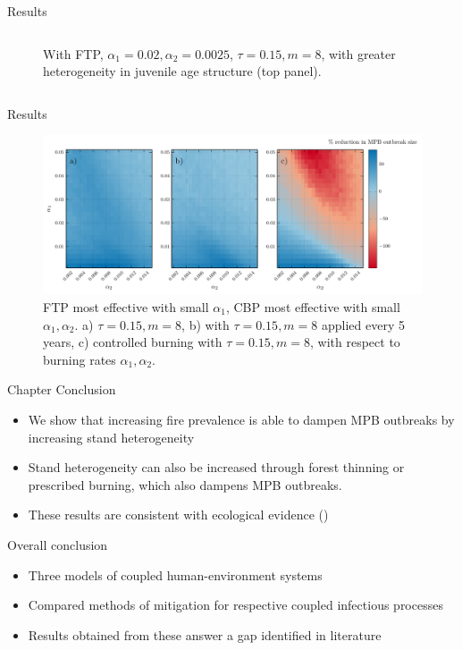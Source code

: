 \documentclass{beamer}
\begin{document}
\begin{frame}{Results}
\begin{columns}
\begin{column}[]{0.5\textwidth}
\begin{figure}
                \caption{\small With FTP, $\alpha_1 = 0.02, \alpha_2 = 0.0025$, $\tau = 0.15, m = 8$, with greater heterogeneity in juvenile age structure (top panel).}
            \end{figure}
        \end{column}
    \end{columns}
\end{frame}


\begin{frame}{Results}
    \begin{figure}
        \includegraphics[width=\textwidth]{mpb/a1_a2_trim_gain.pdf}
        \caption{FTP most effective with small $\alpha_1$, CBP most effective with small $\alpha_1, \alpha_2$.  a) $\tau = 0.15, m = 8$, b) with $\tau = 0.15, m = 8$ applied every 5 years, c) controlled burning with $\tau = 0.15, m = 8$,  with respect to burning rates $\alpha_1,\alpha_2$.}
    \end{figure}
\end{frame} 

\begin{frame}{Chapter Conclusion}
    \begin{itemize}
        \item We show that increasing fire prevalence is able to dampen MPB outbreaks by increasing stand heterogeneity 
        \item Stand heterogeneity can also be increased through forest thinning or prescribed burning, which also dampens MPB outbreaks.
        \item These results are consistent with ecological evidence (\citet{seidl2016spatial,kaufmann2008status})
    \end{itemize}
\end{frame}


\begin{frame}{Overall conclusion}
\begin{itemize}
    \item Three models of coupled human-environment systems
    \item Compared methods of mitigation for respective coupled infectious processes
    \item Results obtained from these answer a gap identified in literature
\end{itemize}
\end{frame}
\end{document}

